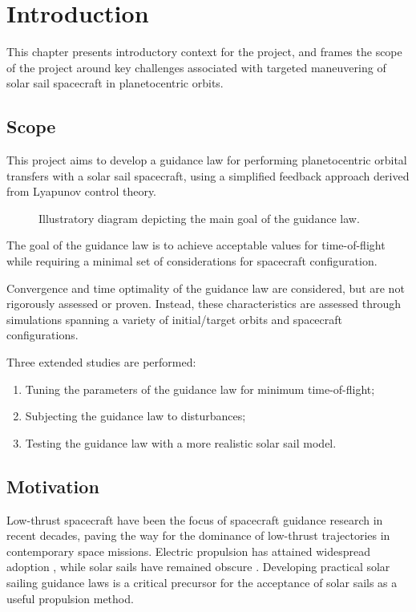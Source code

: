 \chapter{Introduction}
\label{chp:introduction}

This chapter presents introductory context for the project, and frames the scope of the project around key challenges associated with targeted maneuvering of solar sail spacecraft in planetocentric orbits.

\section{Scope}
This project aims to develop a guidance law for performing planetocentric orbital transfers with a solar sail spacecraft, using a simplified feedback approach derived from Lyapunov control theory.

\begin{figure}[H]
    \centering
    
    \caption{Illustratory diagram depicting the main goal of the guidance law.}
    \label{fig:intro_diagram}
\end{figure}



The goal of the guidance law is to achieve acceptable values for time-of-flight while requiring a minimal set of considerations for spacecraft configuration.

Convergence and time optimality of the guidance law are considered, but are not rigorously assessed or proven. Instead, these characteristics are assessed through simulations spanning a variety of initial/target orbits and spacecraft configurations.

Three extended studies are performed:
\begin{enumerate}
    \item Tuning the parameters of the guidance law for minimum time-of-flight;
    \item Subjecting the guidance law to disturbances;
    \item Testing the guidance law with a more realistic solar sail model.
\end{enumerate}

\section{Motivation}
Low-thrust spacecraft have been the focus of spacecraft guidance research in recent decades, paving the way for the dominance of low-thrust trajectories in contemporary space missions. Electric propulsion has attained widespread adoption \cite{lev2019technological, spencer2021lightsail}, while solar sails have remained obscure \cite{mori2010first}. Developing practical solar sailing guidance laws is a critical precursor for the acceptance of solar sails as a useful propulsion method.


